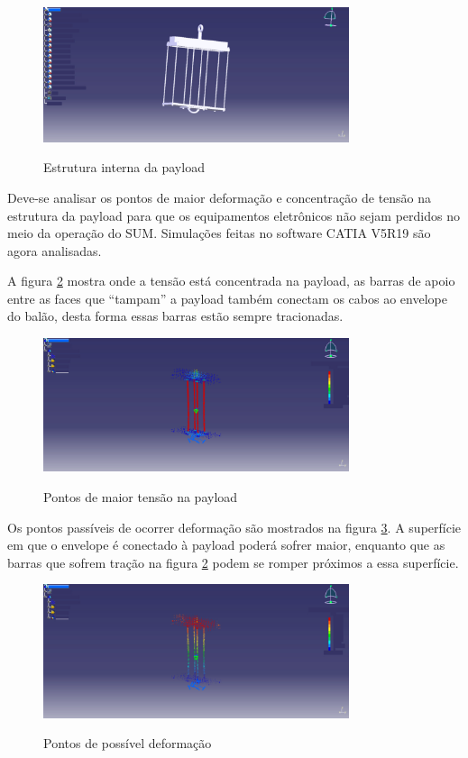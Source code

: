 	\begin{figure}[htp]
		\centering
		\caption{Estrutura interna da payload}
		\includegraphics[width=0.8\textwidth]{figuras/payload3}
		\label{img:payload3}
	\end{figure}

	Deve-se analisar os pontos de maior deformação e concentração de tensão na estrutura da payload para que os equipamentos eletrônicos não sejam perdidos no meio da operação  do SUM. Simulações feitas no software CATIA V5R19 são agora analisadas.

	A figura \ref{img:maior-tensao} mostra onde a tensão está concentrada na payload, as barras de apoio entre as faces que “tampam” a payload também conectam os cabos ao envelope do balão, desta forma essas barras estão sempre tracionadas.

	\begin{figure}[htp]
		\centering
		\caption{Pontos de maior tensão na payload}
		\includegraphics[width=0.8\textwidth]{figuras/maior-tensao}
		\label{img:maior-tensao}
	\end{figure}

	Os pontos passíveis de ocorrer deformação são mostrados na figura \ref{img:pontos-def}. A superfície em que o envelope é conectado à payload poderá sofrer maior, enquanto que as barras que sofrem tração na figura \ref{img:maior-tensao} podem se romper próximos a essa superfície.

	\begin{figure}[htp]
		\centering
		\caption{Pontos de possível deformação}
		\includegraphics[width=0.8\textwidth]{figuras/pontos-def}
		\label{img:pontos-def}
	\end{figure}

